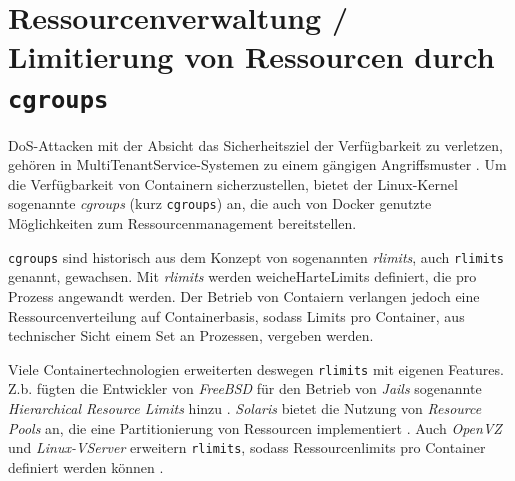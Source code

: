 \documentclass[../main.tex]{subfiles}
\begin{document}
	\section{Ressourcenverwaltung / Limitierung von Ressourcen durch \texttt{\acrshort{cgroups}}}
  \label{secResLimit}
		\acrshort{DoS}-Attacken mit der Absicht das Sicherheitsziel der Verfügbarkeit zu verletzen, gehören in \gls{MultiTenantService}-Systemen zu einem gängigen Angriffsmuster \cite[S.5]{dockerSec1}. Um die Verfügbarkeit von Containern sicherzustellen, bietet der Linux-Kernel sogenannte \emph{\acrlong{cgroups}} (kurz \texttt{\acrshort{cgroups}}) an, die auch von Docker genutzte Möglichkeiten zum Ressourcenmanagement bereitstellen.


		\texttt{\acrshort{cgroups}} sind historisch aus dem Konzept von sogenannten \emph{\acrlong{rlimits}}, auch \texttt{\acrshort{rlimits}} genannt, gewachsen. Mit \emph{rlimits} werden \gls{weicheHarteLimits} definiert, die pro Prozess angewandt werden. Der Betrieb von Contaiern verlangen jedoch eine Ressourcenverteilung auf Containerbasis, sodass Limits pro Container, aus technischer Sicht einem Set an Prozessen, vergeben werden.


		Viele Containertechnologien erweiterten deswegen \texttt{\acrshort{rlimits}} mit eigenen Features. Z.b. fügten die Entwickler von \emph{FreeBSD} für den Betrieb von \emph{Jails} sogenannte \emph{Hierarchical Resource Limits} hinzu \cite{freeBsdRCTL}. \emph{Solaris} bietet die Nutzung von \emph{Resource Pools} an, die eine Partitionierung von Ressourcen implementiert \cite{cgroupsUniHierarchyDoc}. Auch \emph{OpenVZ} und \emph{Linux-VServer} erweitern \texttt{\acrshort{rlimits}}, sodass Ressourcenlimits pro Container definiert werden können \cite[S.15+16]{dockerSec2}.
\end{document}
